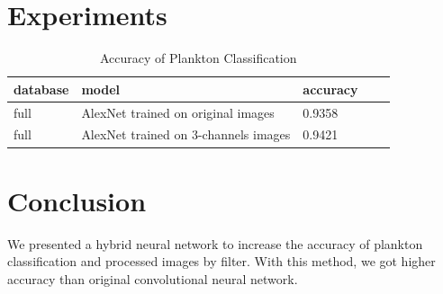 \documentclass[conference]{IEEEtran}
\begin{document}
\newpage
\section{Experiments}
\begin{table}[!ht]
  \caption{Accuracy of Plankton Classification}
  \centering
  \begin{tabular}{lllll}
    \toprule
    \cmidrule{1-3}
    database     &model       &accuracy  \\
    \midrule
    full & AlexNet trained on original images   & 0.9358 \\ \hline
    full & AlexNet trained on 3-channels images   &0.9421   \\
    \bottomrule
  \end{tabular}
\end{table}




\section{Conclusion}
We presented a hybrid neural network to increase the accuracy of plankton classification and processed images by filter. With this method, we got higher accuracy than original convolutional neural network. 




\end{document}
